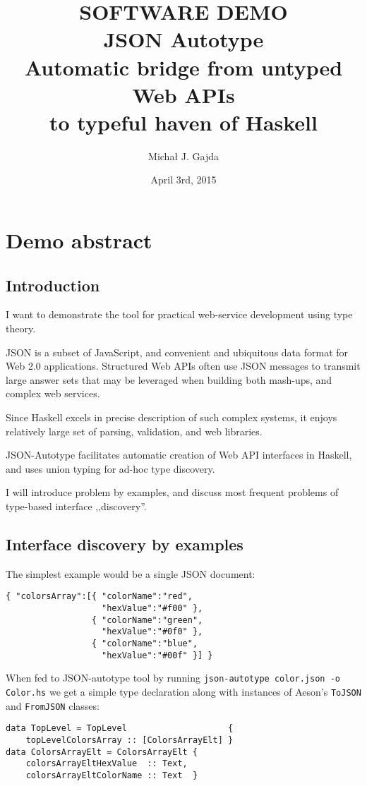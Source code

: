 \documentclass[11pt]{article}
\title{\textbf{SOFTWARE DEMO\\JSON Autotype \\\large{Automatic bridge from untyped Web APIs\\to typeful haven of Haskell}}}
\author{Micha\l{} J. Gajda}
\date{April 3rd, 2015}
\begin{document}
\maketitle

\section*{Demo abstract}
\subsection*{Introduction}
I want to demonstrate the tool for practical web-service development using type theory.

JSON is a subset of JavaScript, and convenient and ubiquitous data format for Web 2.0 applications. Structured Web APIs often use JSON messages to transmit large answer sets that may be leveraged when building both mash-ups, and complex web services.

Since Haskell excels in precise description of such complex systems, it enjoys relatively large set of parsing, validation, and web libraries.

JSON-Autotype facilitates automatic creation of Web API interfaces in Haskell, and uses union typing for ad-hoc type discovery.

I will introduce problem by examples, and discuss most frequent problems of type-based interface ,,discovery''.

\subsection*{Interface discovery by examples}

The simplest example would be a single JSON document:

\begin{verbatim}
{ "colorsArray":[{ "colorName":"red",
                   "hexValue":"#f00" },
                 { "colorName":"green",
                   "hexValue":"#0f0" },
                 { "colorName":"blue",
                   "hexValue":"#00f" }] }
\end{verbatim}

When fed to JSON-autotype tool by running \texttt{json-autotype color.json -o Color.hs} we get a simple type declaration along with instances of Aeson's \texttt{ToJSON} and \texttt{FromJSON} classes:

\begin{verbatim}
data TopLevel = TopLevel                    { 
    topLevelColorsArray :: [ColorsArrayElt] }
data ColorsArrayElt = ColorsArrayElt { 
    colorsArrayEltHexValue  :: Text,
    colorsArrayEltColorName :: Text  }
\end{verbatim}
\end{document}
